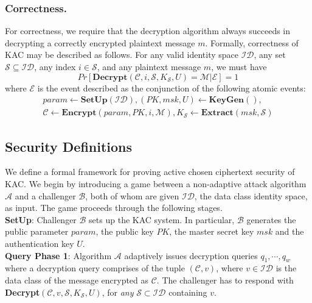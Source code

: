 \subsubsection{Correctness.} For correctness, we require that the decryption algorithm always succeeds in decrypting a correctly encrypted plaintext message $m$. Formally, correctness of KAC may be described as follows. For any valid identity space $\mathcal{ID}$, any set $\mathcal{S}\subseteq\mathcal{ID}$, any index $i\in\mathcal{S}$, and any plaintext message $m$, we must have 
\begin{equation}
 Pr[\textbf{Decrypt}(\mathcal{C},i,\mathcal{S},K_{\mathcal{S}},U)=\mathcal{M} |\mathcal{E}]=1\nonumber
\end{equation}
where $\mathcal{E}$ is the event described as the conjunction of the following atomic events:
\begin{equation}
\begin{split}
param\leftarrow\textbf{SetUp}(\mathcal{ID}),(PK,msk,U)\leftarrow\textbf{KeyGen}(),\\
\mathcal{C}\leftarrow\textbf{Encrypt}(param,PK,i,\mathcal{M}),K_{\mathcal{S}}\leftarrow\textbf{Extract}(msk,\mathcal{S})\nonumber
\end{split} 
\end{equation}


\subsection{Security Definitions}
\label{subsec:security}

We define a formal framework for proving active chosen ciphertext security of KAC. We begin by introducing a game between a non-adaptive attack algorithm $\mathcal{A}$ and a challenger $\mathcal{B}$, both of whom are given $\mathcal{ID}$, the data class identity space, as input. The game proceeds through the following stages.\\
 
\noindent\textbf{SetUp}: Challenger $\mathcal{B}$ sets up the KAC system. In particular, $\mathcal{B}$ generates the public parameter $param$, the public key $PK$, the master secret key $msk$ and the authentication key $U$.\\ 
 
\noindent\textbf{Query Phase 1}: Algorithm $\mathcal{A}$ adaptively issues decryption queries $q_1,\cdots,q_w$ where a decryption query comprises of the tuple $(\mathcal{C},v)$, where $v\in\mathcal{ID}$ is the data class of the message encrypted as $\mathcal{C}$. The challenger has to respond with \textbf{Decrypt}$(\mathcal{C},v,\mathcal{S},K_{\mathcal{S}},U)$, for \emph{any} $\mathcal{S}\subset\mathcal{ID}$ containing $v$.\\
 
